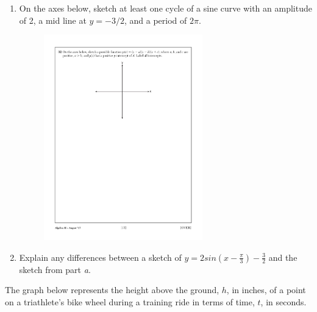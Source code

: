 \newpage %
\item %
\begin{enumerate}
\item  On the axes below, sketch at least one cycle of a sine curve with an amplitude of 2, a mid line at $y = -3/2$, and a period of $2\pi$.

\vspace{0.5 in}
\begin{figure}[!ht]
    \centering
    \includegraphics[width=0.65\textwidth]{simple-axes.pdf}
\end{figure}

\item
Explain any differences between a sketch of $\displaystyle y = 2 sin{\left( x - \frac{\pi}{3}\right)} - \frac{3}{2}$ and the sketch from part \textit{a}.
\end{enumerate}

\newpage %
\item  %
The graph below represents the height above the ground, $h$, in inches, of a point on a triathlete’s bike wheel during a training ride in terms of time, $t$, in seconds.


